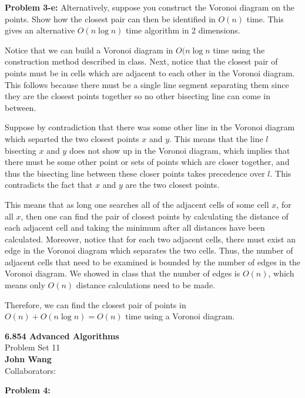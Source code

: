 \documentclass[psamsfonts]{amsart}
\newenvironment{sol}{\vspace{0.25cm}{\large \bfseries Solution:}}{\qedsymbol}
\newenvironment{prob}[1]{\begin{framed}{\large \bfseries Problem #1:}}{\end{framed}}
\newcommand{\makenewtitle}{
    \begin{center}
    {\huge \bfseries 6.854 Advanced Algorithms} \\
    Problem Set 11\\
    \vspace{0.25cm}
    {\bfseries John Wang} \\
    Collaborators:  
    \end{center}
    \vspace{0.5cm}
}
\begin{document}
\begin{prob}{3-e}
Alternatively, suppose you construct the Voronoi diagram on the points. Show how the closest pair can then be identified in $O(n)$ time. This gives an alternative $O(n \log n)$ time algorithm in 2 dimensions.
\end{prob}
\begin{sol}
Notice that we can build a Voronoi diagram in $O(n \log n$ time using the construction method described in class. Next, notice that the closest pair of points must be in cells which are adjacent to each other in the Voronoi diagram. This follows because there must be a single line segment separating them since they are the closest points together so no other bisecting line can come in between. 

Suppose by contradiction that there was some other line in the Voronoi diagram which separted the two closest points $x$ and $y$. This means that the line $l$ bisecting $x$ and $y$ does not show up in the Voronoi diagram, which implies that there must be some other point or sets of points which are closer together, and thus the bisecting line between these closer points takes precedence over $l$. This contradicts the fact that $x$ and $y$ are the two closest points.

This means that as long one searches all of the adjacent cells of some cell $x$, for all $x$, then one can find the pair of closest points by calculating the distance of each adjacent cell and taking the minimum after all distances have been calculated. Moreover, notice that for each two adjacent cells, there must exist an edge in the Voronoi diagram which separates the two cells. Thus, the number of adjacent cells that need to be examined is bounded by the number of edges in the Voronoi diagram. We showed in class that the number of edges is $O(n)$, which means only $O(n)$ distance calculations need to be made.

Therefore, we can find the closest pair of points in $O(n) + O(n \log n) = O(n)$ time using a Voronoi diagram.
\end{sol}

\newpage
\makenewtitle

\begin{prob}{4}
\end{prob}
\begin{sol}
\end{sol}
\end{document}
